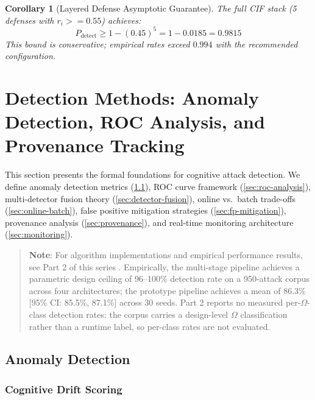 \documentclass[
]{article}
\newtheorem{corollary}[theorem]{Corollary}
\begin{document}
\begin{corollary}[Layered Defense Asymptotic Guarantee]
\label{cor:layered-defense}
The full CIF stack (5 defenses with $r_i >= 0.55$) achieves:
\begin{equation}
\label{eq:layered-guarantee}
P_{\text{detect}} \geq 1 - (0.45)^5 = 1 - 0.0185 = 0.9815
\end{equation}
This bound is conservative; empirical rates exceed $0.994$ with the recommended configuration.
\end{corollary}

\newpage

\newpage

\section{Detection Methods: Anomaly Detection, ROC Analysis, and
Provenance Tracking}\label{sec:detection-methods}

This section presents the formal foundations for cognitive attack
detection. We define anomaly detection metrics
(\cref{sec:anomaly-detection}), ROC curve framework
(\cref{sec:roc-analysis}), multi-detector fusion theory
(\cref{sec:detector-fusion}), online vs.~batch trade-offs
(\cref{sec:online-batch}), false positive mitigation strategies
(\cref{sec:fp-mitigation}), provenance analysis (\cref{sec:provenance}),
and real-time monitoring architecture (\cref{sec:monitoring}).

\begin{quote}
\textbf{Note}: For algorithm implementations and empirical performance
results, see Part 2 of this series \cite{friedman2026cogsec2}.
Empirically, the multi-stage pipeline achieves a parametric design
ceiling of 96--100\% detection rate on a 950-attack corpus across four
architectures; the prototype pipeline achieves a mean of 86.3\% {[}95\%
CI: 85.5\%, 87.1\%{]} across 30 seeds. Part 2 reports no measured
per-\(\Omega\)-class detection rates: the corpus carries a design-level
\(\Omega\) classification rather than a runtime label, so per-class
rates are not evaluated.
\end{quote}

\subsection{Anomaly Detection}\label{sec:anomaly-detection}

\subsubsection{Cognitive Drift Scoring}\label{cognitive-drift-scoring}
\end{document}
